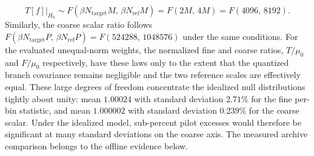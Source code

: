 \begin{equation}
T[f] \big|_{H_0} \sim F(\beta N_{\text{target}} M, \, \beta N_{\text{ref}} M) = F(2M, \, 4M) = F(4096, \, 8192).
\end{equation}
Similarly, the coarse scalar ratio follows $F(\beta N_{\text{target}} P, \, \beta N_{\text{ref}} P) = F(524288, \, 1048576)$ under the same conditions. For the evaluated unequal-norm weights, the normalized fine and coarse ratios, $T/\mu_0$ and $F/\mu_0$ respectively, have these laws only to the extent that the quantized branch covariance remains negligible and the two reference scales are effectively equal. These large degrees of freedom concentrate the idealized null distributions tightly about unity: mean $1.00024$ with standard deviation $2.71\%$ for the fine per-bin statistic, and mean $1.000002$ with standard deviation $0.239\%$ for the coarse scalar. Under the idealized model, sub-percent pilot excesses would therefore be significant at many standard deviations on the coarse axis. The measured archive comparison belongs to the offline evidence below.

